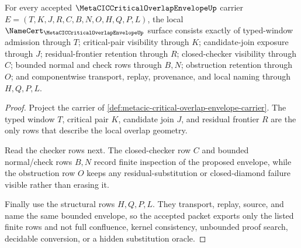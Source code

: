 \begin{theorem}
\label{thm:metacic-critical-overlap-envelope-obligations}
For every accepted $\MetaCICCriticalOverlapEnvelopeUp$ carrier $E=(T,K,J,R,C,B,N,O,H,Q,P,L)$, the local $\NameCert_{\MetaCICCriticalOverlapEnvelopeUp}$ surface consists exactly of typed-window admission through $T$; critical-pair visibility through $K$; candidate-join exposure through $J$; residual-frontier retention through $R$; closed-checker visibility through $C$; bounded normal and check rows through $B,N$; obstruction retention through $O$; and componentwise transport, replay, provenance, and local naming through $H,Q,P,L$.
\end{theorem}
\begin{proof}
Project the carrier of \autoref{def:metacic-critical-overlap-envelope-carrier}. The typed window $T$, critical pair $K$, candidate join $J$, and residual frontier $R$ are the only rows that describe the local overlap geometry.

Read the checker rows next. The closed-checker row $C$ and bounded normal/check rows $B,N$ record finite inspection of the proposed envelope, while the obstruction row $O$ keeps any residual-substitution or closed-diamond failure visible rather than erasing it.

Finally use the structural rows $H,Q,P,L$. They transport, replay, source, and name the same bounded envelope, so the accepted packet exports only the listed finite rows and not full confluence, kernel consistency, unbounded proof search, decidable conversion, or a hidden substitution oracle.
\end{proof}




